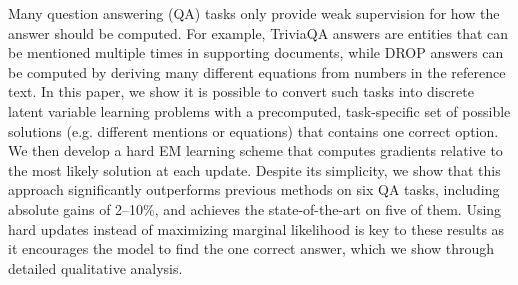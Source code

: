 Many question answering (QA) tasks only provide weak supervision for how the answer should be computed. For example, TriviaQA answers are entities that can be mentioned multiple times in supporting documents, while DROP answers can be computed by deriving many different equations from numbers in the reference text. In this paper, we show it is possible to convert such tasks into discrete latent variable learning problems with a precomputed, task-specific set of possible solutions (e.g. different mentions or equations) that contains one correct option. We then develop a hard EM learning scheme that computes gradients relative to the most likely solution at each update. Despite its simplicity, we show that this approach significantly outperforms previous methods on six QA tasks, including absolute gains of 2–10\%, and achieves the state-of-the-art on five of them. Using hard updates instead of maximizing marginal likelihood is key to these results as it encourages the model to find the one correct answer, which we show through detailed qualitative analysis.